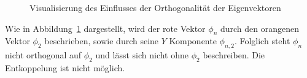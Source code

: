 \documentclass[
  letterpaper,
  DIV=11]{scrreprt}
\begin{document}
\begin{figure}
\begin{minipage}[t]{0.50\linewidth}
{

}

\end{minipage}%

\caption{\label{fig-ems_nach_ortho}Visualisierung des Einflusses der
Orthogonalität der Eigenvektoren}

\end{figure}

Wie in Abbildung~\ref{fig-ems_nach_ortho} dargestellt, wird der rote
Vektor \(\phi_n\) durch den orangenen Vektor \(\phi_2\) beschrieben,
sowie durch seine \(Y\) Komponente \(\phi_{n,2}\). Folglich steht
\(\phi_n\) nicht orthogonal auf \(\phi_2\) und lässt sich nicht ohne
\(\phi_2\) beschreiben. Die Entkoppelung ist nicht möglich.
\end{document}
